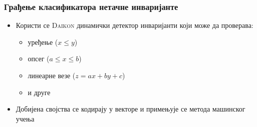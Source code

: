 \documentclass{beamer}
\begin{document}
\begin{frame}[fragile]
\frametitle{Грађење класификатора нетачне инваријанте}
\begin{itemize}
\item Користи се \textsc{Daikon} динамички детектор инваријанти који може да проверава:
    \begin{itemize}
        \item уређење ($x \leq y$)
        \item опсег ($a \leq x \leq b$)
        \item линеарне везе ($z = ax + by + c$)
        \item и друге
    \end{itemize}
\item Добијена својства се кодирају у векторе и примењује се метода машинског учења
\end{itemize}



\end{frame}
\end{document}
